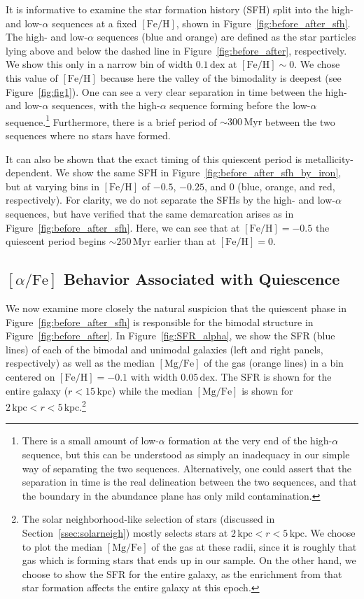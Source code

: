 \documentclass[linenumbers, twocolumn]{aastex631}
\newcommand{\Myr}{\ensuremath{\textrm{Myr}}}
\newcommand{\kpc}{\ensuremath{\textrm{kpc}}}
\newcommand{\FeH}{\ensuremath{[\textrm{Fe}/\textrm{H}]}}
\newcommand{\MgFe}{\ensuremath{[\textrm{Mg}/\textrm{Fe}]}}
\newcommand{\alphaFe}{\ensuremath{[\alpha/\textrm{Fe}]}}
\newcommand{\dex}{\ensuremath{\textrm{dex}}}
\begin{document}
It is informative to examine the star formation history (SFH) split into the high- and low-$\alpha$ sequences at a fixed \FeH{}, shown in Figure~\ref{fig:before_after_sfh}. The high- and low-$\alpha$ sequences (blue and orange) are defined as the star particles lying above and below the dashed line in Figure~\ref{fig:before_after}, respectively. We show this only in a narrow bin of width $0.1\,\dex$ at $\FeH\sim0$. We chose this value of \FeH{} because here the valley of the bimodality is deepest (see Figure~\ref{fig:fig1}). One can see a very clear separation in time between the high- and low-$\alpha$ sequences, with the high-$\alpha$ sequence forming before the low-$\alpha$ sequence.\footnote{There is a small amount of low-$\alpha$ formation at the very end of the high-$\alpha$ sequence, but this can be understood as simply an inadequacy in our simple way of separating the two sequences. Alternatively, one could assert that the separation in time is the real delineation between the two sequences, and that the boundary in the abundance plane has only mild contamination.} Furthermore, there is a brief period of $\sim300\,\Myr$ between the two sequences where no stars have formed.

It can also be shown that the exact timing of this quiescent period is metallicity-dependent. We show the same SFH in Figure~\ref{fig:before_after_sfh_by_iron}, but at varying bins in \FeH{} of $-0.5$, $-0.25$, and $0$ (blue, orange, and red, respectively). For clarity, we do not separate the SFHs by the high- and low-$\alpha$ sequences, but have verified that the same demarcation arises as in Figure~\ref{fig:before_after_sfh}. Here, we can see that at $\FeH=-0.5$ the quiescent period begins $\sim250\,\Myr$ earlier than at $\FeH=0$.

\subsection{\alphaFe{} Behavior Associated with Quiescence}
We now examine more closely the natural suspicion that the quiescent phase in Figure~\ref{fig:before_after_sfh} is responsible for the bimodal structure in Figure~\ref{fig:before_after}. In Figure~\ref{fig:SFR_alpha}, we show the SFR (blue lines) of each of the bimodal and unimodal galaxies (left and right panels, respectively) as well as the median \MgFe{} of the gas (orange lines) in a bin centered on $\FeH{}=-0.1$ with width $0.05\,\dex$. The SFR is shown for the entire galaxy ($r<15\,\kpc$) while the median \MgFe{} is shown for $2\,\kpc<r<5\,\kpc$.\footnote{The solar neighborhood-like selection of stars (discussed in Section~\ref{ssec:solarneigh}) mostly selects stars at $2\,\kpc<r<5\,\kpc$. We choose to plot the median \MgFe{} of the gas at these radii, since it is roughly that gas which is forming stars that ends up in our sample. On the other hand, we choose to show the SFR for the entire galaxy, as the enrichment from that star formation affects the entire galaxy at this epoch.}
\end{document}
